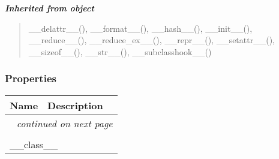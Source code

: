 \large{\textbf{\textit{Inherited from object}}}

\begin{quote}
\_\_delattr\_\_(), \_\_format\_\_(), \_\_hash\_\_(), \_\_init\_\_(), \_\_reduce\_\_(), \_\_reduce\_ex\_\_(), \_\_repr\_\_(), \_\_setattr\_\_(), \_\_sizeof\_\_(), \_\_str\_\_(), \_\_subclasshook\_\_()
\end{quote}


  \subsubsection{Properties}

    \vspace{-1cm}
\hspace{\varindent}\begin{longtable}{|p{\varnamewidth}|p{\vardescrwidth}|l}
\cline{1-2}
\cline{1-2} \centering \textbf{Name} & \centering \textbf{Description}& \\
\cline{1-2}
\endhead\cline{1-2}\multicolumn{3}{r}{\small\textit{continued on next page}}\\\endfoot\cline{1-2}
\endlastfoot\multicolumn{2}{|l|}{\textit{Inherited from object}}\\
\multicolumn{2}{|p{\varwidth}|}{\raggedright \_\_class\_\_}\\
\cline{1-2}
\end{longtable}

